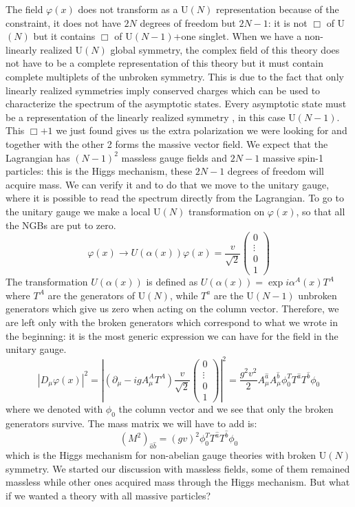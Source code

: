 \documentclass[../main.tex]{subfiles}
\begin{document}
The field $\varphi(x)$ does not transform as a U$(N)$ representation because of the constraint, it does not have $2N$ degrees of freedom but $2N-1$: it is not $\Box$ of U$(N)$ but it contains $\Box$ of U$(N-1)$+one singlet. When we have a non-linearly realized U$(N)$ global symmetry, the complex field of this theory does not have to be a complete representation of this theory but it must contain complete multiplets of the unbroken symmetry. This is due to the fact that only linearly realized symmetries imply conserved charges which can be used to characterize the spectrum of the asymptotic states. Every asymptotic state must be a representation of the linearly realized symmetry , in this case U$(N-1)$. This $\Box+1$ we just found gives us the extra polarization we were looking for and together with the other 2 forms the massive vector field. We expect that the Lagrangian has $(N-1)^2$ massless gauge fields and $2N-1$ massive spin-1 particles: this is the Higgs mechanism, these $2N-1$ degrees of freedom will acquire mass. We can verify it and to do that we move to the unitary gauge, where it is possible to read the spectrum directly from the Lagrangian. To go to the unitary gauge we make a local U$(N)$ transformation on $\varphi(x)$, so that all the NGBs are put to zero.
\[
\varphi(x)\to U(\alpha(x))\varphi(x)=\frac{v}{\sqrt{2}}\begin{pmatrix}
    0\\
    \vdots\\
    0\\
    1
\end{pmatrix}
\]
The transformation $U(\alpha(x))$ is defined as $U(\alpha(x))=\exp{i\alpha^A(x)T^A}$ where $T^A$ are the generators of U$(N)$, while $T^a$ are the U$(N-1)$ unbroken generators which give us zero when acting on the column vector. Therefore, we are left only with the broken generators which correspond to what we wrote in the beginning: it is the most generic expression we can have for the field in the unitary gauge.
\[
|D_\mu\varphi(x)|^2=\left|(\partial_\mu-igA_\mu^AT^A)\frac{v}{\sqrt{2}}\begin{pmatrix}
    0\\
    \vdots\\
    0\\1
\end{pmatrix}\right|^2=\frac{g^2v^2}{2}A_\mu^{\hat{a}}A_\mu^{\hat{b}}\phi_0^TT^{\hat{a}}T^{\hat{b}}\phi_0
\]
where we denoted with $\phi_0$ the column vector and we see that only the broken generators survive. The mass matrix we will have to add is:
\[
(M^2)_{\hat{a}\hat{b}}=(gv)^2\phi_0^TT^{\hat{a}}T^{\hat{b}}\phi_0
\]
which is the Higgs mechanism for non-abelian gauge theories with broken U$(N)$ symmetry. We started our discussion with massless fields, some of them remained massless while other ones acquired mass through the Higgs mechanism. But what if we wanted a theory with all massive particles? 
\end{document}
